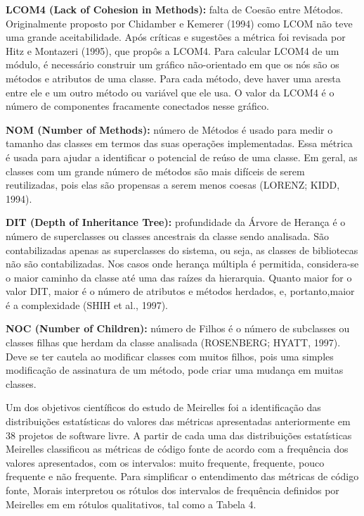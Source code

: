 \textbf{LCOM4 (Lack of Cohesion in Methods):} falta de Coesão entre Métodos. Originalmente
proposto por Chidamber e Kemerer (1994) como LCOM não teve uma
grande aceitabilidade. Após críticas e sugestões a métrica foi revisada por Hitz e
Montazeri (1995), que propôs a LCOM4. Para calcular LCOM4 de um módulo, é
necessário construir um gráfico não-orientado em que os nós são os métodos e atributos
de uma classe. Para cada método, deve haver uma aresta entre ele e um outro
método ou variável que ele usa. O valor da LCOM4 é o número de componentes
fracamente conectados nesse gráfico.

 \vspace{\onelineskip} 

\textbf{NOM (Number of Methods):} número de Métodos é usado para medir o tamanho
das classes em termos das suas operações implementadas. Essa métrica é usada para
ajudar a identificar o potencial de reúso de uma classe. Em geral, as classes com
um grande número de métodos são mais difíceis de serem reutilizadas, pois elas são
propensas a serem menos coesas (LORENZ; KIDD, 1994).

 \vspace{\onelineskip} 

\textbf{DIT (Depth of Inheritance Tree):} profundidade da Árvore de Herança é o número
de superclasses ou classes ancestrais da classe sendo analisada. São contabilizadas
apenas as superclasses do sistema, ou seja, as classes de bibliotecas não são
contabilizadas. Nos casos onde herança múltipla é permitida, considera-se o maior
caminho da classe até uma das raízes da hierarquia. Quanto maior for o valor DIT,
maior é o número de atributos e métodos herdados, e, portanto,maior é a complexidade
(SHIH et al., 1997).

 \vspace{\onelineskip} 

\textbf{NOC (Number of Children):} número de Filhos é o número de subclasses ou classes
filhas que herdam da classe analisada (ROSENBERG; HYATT, 1997). Deve se ter
cautela ao modificar classes com muitos filhos, pois uma simples modificação de
assinatura de um método, pode criar uma mudança em muitas classes.

 \vspace{\onelineskip} 

Um dos objetivos científicos do estudo de Meirelles foi a identificação das distribuições estatísticas do valores das métricas apresentadas anteriormente em 38 projetos
de software livre. A partir de cada uma das distribuições estatísticas Meirelles classificou as métricas de código fonte de acordo com a frequência dos valores apresentados,
com os intervalos: muito frequente, frequente, pouco frequente e não frequente. Para simplificar o entendimento das métricas de código fonte, Morais interpretou os rótulos dos
intervalos de frequência definidos por Meirelles em em rótulos qualitativos, tal como a Tabela 4. 

